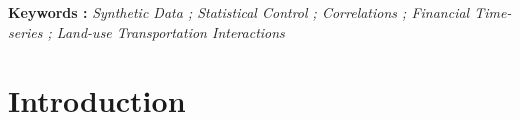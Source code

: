 \begin{abstract}
\end{abstract}

\medskip

\textbf{Keywords : } \textit{Synthetic Data ; Statistical Control ; Correlations ; Financial Time-series ; Land-use Transportation Interactions
}


\section{Introduction}

